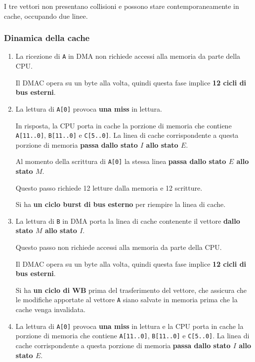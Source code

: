 \documentclass[a4paper]{article}
\begin{document}
I tre vettori non presentano collisioni e possono stare contemporaneamente in cache, occupando due linee.

\subsubsection{Dinamica della cache}

\begin{enumerate}
\item La ricezione di \texttt{A} in DMA non richiede accessi alla memoria da parte della CPU.

Il DMAC opera su un byte alla volta, quindi questa fase implice \textbf{12 cicli di bus esterni}.

\item La lettura di \texttt{A[0]} provoca \textbf{una miss} in lettura. 

In risposta, la CPU porta in cache la porzione di memoria che contiene \texttt{A[11..0]}, \texttt{B[11..0]} e \texttt{C[5..0]}.
La linea di cache corrispondente a questa porzione di memoria \textbf{passa dallo stato $I$ allo stato $E$}.

Al momento della scrittura di \texttt{A[0]} la stessa linea \textbf{passa dallo stato $E$ allo stato $M$}.

Questo passo richiede 12 letture dalla memoria e 12 scritture.

Si ha \textbf{un ciclo burst di bus esterno} per riempire la linea di cache.

\item La lettura di \texttt{B} in DMA porta la linea di cache contenente il vettore \textbf{dallo stato $M$ allo stato $I$}.

Questo passo non richiede accessi alla memoria da parte della CPU.

Il DMAC opera su un byte alla volta, quindi questa fase implice \textbf{12 cicli di bus esterni}.

Si ha \textbf{un ciclo di WB} prima del trasferimento del vettore, che assicura che le modifiche apportate al vettore \texttt{A} siano salvate in memoria prima che la cache venga invalidata.

\item La lettura di \texttt{A[0]} provoca \textbf{una miss} in lettura e la CPU porta in cache la porzione di memoria che contiene \texttt{A[11..0]}, \texttt{B[11..0]} e \texttt{C[5..0]}.
La linea di cache corrispondente a questa porzione di memoria \textbf{passa dallo stato $I$ allo stato $E$}.


\end{enumerate}
\end{document}
